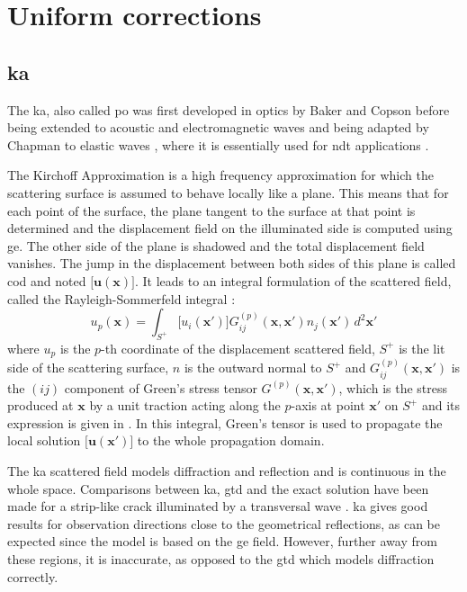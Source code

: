 \section{Uniform corrections}
\label{sectUnif}
\subsection{\acrfull{ka}}
\label{sectKA}
The \acrfull{ka}, also called \acrfull{po} was first developed in optics by Baker and Copson \cite{POoptics} before being extended to acoustic and electromagnetic waves \cite{POtechreport, POLewis} and being adapted by Chapman to elastic waves \cite{POChapman}, where it is essentially used for \acrshort{ndt} applications \cite{Schmerr,Dorval}.

The Kirchoff Approximation is a high frequency approximation for which the scattering surface is assumed to behave locally like a plane. This means that for each point of the surface, the plane tangent to the surface at that point is determined and the displacement field on the illuminated side is computed using \acrshort{ge}. The other side of the plane is shadowed and the total displacement field vanishes. The jump in the displacement between both sides of this plane is called \acrfull{cod} and noted $\lbrack \mathbf{u}(\mathbf{x}) \rbrack$. It leads to an integral formulation of the scattered field, called the Rayleigh-Sommerfeld integral \cite{POChapman} :
\begin{equation}
u_p(\mathbf{x})=\int_{S^+}\lbrack u_i(\mathbf{x'})\rbrack G_{ij}^{(p)}(\mathbf{x},\mathbf{x'})n_j(\mathbf{x'})\,d^2\mathbf{x'}
\label{intKA}
\end{equation}
where $u_p$ is the $p$-th coordinate of the displacement scattered field, $S^+$ is the lit side of the scattering surface, $n$ is the outward normal to $S^+$ and $G_{ij}^{(p)}(\mathbf{x},\mathbf{x'})$ is the $(ij)$ component of Green's stress tensor $G^{(p)}(\mathbf{x},\mathbf{x'})$, which is the stress produced at $\mathbf{x}$ by a unit traction acting along the $p$-axis at point $\mathbf{x'}$ on $S^+$ and its expression is given in \cite{POChapman}. In this integral, Green's tensor is used to propagate the local solution $\lbrack \mathbf{u}(\mathbf{x'}) \rbrack$ to the whole propagation domain.

The \acrshort{ka} scattered field models diffraction and reflection and is continuous in the whole space. Comparisons between \acrshort{ka}, \acrshort{gtd} and the exact solution have been made for a strip-like crack illuminated by a transversal wave \cite{POChapman,systmodel}. \acrshort{ka} gives good results for observation directions close to the geometrical reflections, as can be expected since the model is based on the \acrshort{ge} field. However, further away from these regions, it is inaccurate, as opposed to the \acrshort{gtd} which models diffraction correctly.


